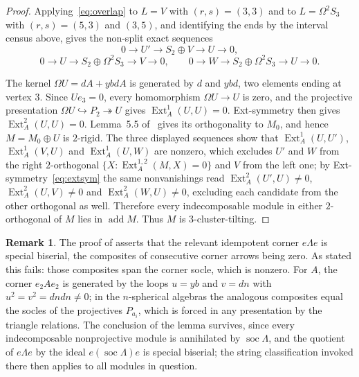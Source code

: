 \documentclass[11pt]{amsart}
\theoremstyle{plain}
\theoremstyle{definition}
\newtheorem{remark}[theorem]{Remark}
\DeclareMathOperator{\Ext}{Ext}
\DeclareMathOperator{\add}{add}
\DeclareMathOperator{\soc}{soc}
\begin{document}
\begin{proof}
Applying~\eqref{eq:overlap} to $L=V$ with $(r,s)=(3,3)$ and to $L=\Omega^2S_3$ with $(r,s)=(5,3)$ and $(3,5)$,
and identifying the ends by the interval census above, gives the non-split exact sequences
\[
 0\longrightarrow U'\longrightarrow S_2\oplus V\longrightarrow U\longrightarrow0,
\]
\[
 0\longrightarrow U\longrightarrow S_2\oplus\Omega^2S_3\longrightarrow V\longrightarrow0,
 \qquad
 0\longrightarrow W\longrightarrow S_2\oplus\Omega^2S_3\longrightarrow U\longrightarrow0.
\]

The kernel $\Omega U=dA+ybdA$ is generated by $d$ and $ybd$, two elements ending at vertex $3$. Since
$Ue_3=0$, every homomorphism $\Omega U\to U$ is zero, and the projective presentation $\Omega U\hookrightarrow
P_2\twoheadrightarrow U$ gives $\Ext^1_A(U,U)=0$. Ext-symmetry then gives $\Ext^2_A(U,U)=0$. Lemma~5.5
of~\cite{Erdmann} gives its orthogonality to $M_0$, and hence $M=M_0\oplus U$ is $2$-rigid. The three
displayed sequences show that $\Ext^1_A(U,U')$, $\Ext^1_A(V,U)$ and $\Ext^1_A(U,W)$ are nonzero, which
excludes $U'$ and $W$ from the right $2$-orthogonal $\{X:\Ext^{1,2}_A(M,X)=0\}$ and $V$ from the left one; by
Ext-symmetry~\eqref{eq:extsym} the same nonvanishings read $\Ext^2_A(U',U)\neq0$, $\Ext^2_A(U,V)\neq0$ and
$\Ext^2_A(W,U)\neq0$, excluding each candidate from the other orthogonal as well. Therefore every
indecomposable module in either $2$-orthogonal of $M$ lies in $\add M$. Thus $M$ is $3$-cluster-tilting.
\end{proof}

\begin{remark}\label{rem:socle}
The proof of \cite[Lemma~5.3]{Erdmann} asserts that the relevant idempotent corner $e\Lambda e$ is special
biserial, the composites of consecutive corner arrows being zero. As stated this fails: those composites span
the corner socle, which is nonzero. For $A$, the corner $e_2Ae_2$ is generated by the loops $u=yb$ and $v=dn$
with $u^2=v^2=dndn\neq0$; in the $n$-spherical algebras the analogous composites equal the socles of the
projectives $P_{a_i}$, which is forced in any presentation by the triangle relations. The conclusion of the
lemma survives, since every indecomposable nonprojective module is annihilated by $\soc\Lambda$, and the
quotient of $e\Lambda e$ by the ideal $e(\soc\Lambda)e$ is special biserial; the string classification invoked
there then applies to all modules in question.
\end{remark}
\end{document}
